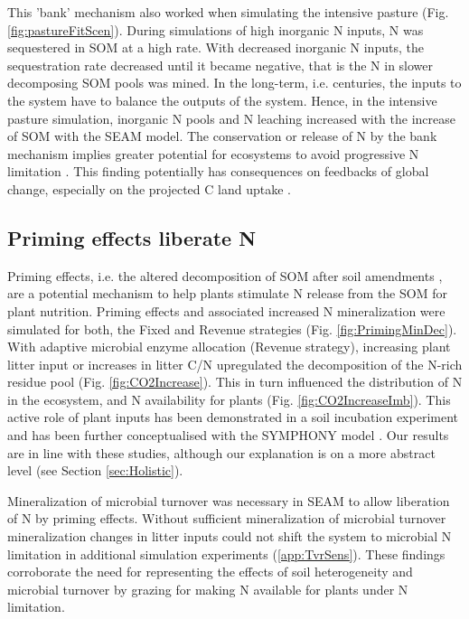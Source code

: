This 'bank' mechanism \citep[sensu][]{Perveen14} also worked when simulating the
intensive pasture (Fig. \ref{fig:pastureFitScen}). During simulations of high
inorganic N inputs, N was sequestered in SOM at a high rate. With decreased
inorganic N inputs, the sequestration rate decreased until it became negative,
that is the N in slower decomposing SOM pools was mined. In the
long-term, i.e.
centuries, the inputs to the system have to balance the outputs of the system. Hence, in
the intensive pasture simulation, inorganic N pools and N leaching increased with
the increase of SOM with the SEAM model. The conservation or release of N by the
bank mechanism implies greater potential for ecosystems to avoid progressive N
limitation \citep{Norby10, Franklin14, Averill15}. This finding
potentially has consequences on feedbacks of global change, especially on the
projected C land uptake \citep{Friedlingstein14}.

\subsection{Priming effects liberate N}
Priming effects, i.e. the altered decomposition of SOM after soil amendments
\citep{Kuzyakov00}, are a potential mechanism to help plants stimulate N release
from the SOM for plant nutrition.
Priming effects and associated increased N mineralization were simulated for
both, the Fixed and Revenue strategies (Fig. \ref{fig:PrimingMinDec}). With
adaptive microbial enzyme allocation (Revenue strategy), increasing
plant litter input or increases in litter C/N upregulated
the decomposition of the N-rich residue pool (Fig.
\ref{fig:CO2Increase}).
This in turn influenced the distribution of N in the ecosystem, and N
availability for plants (Fig.
\ref{fig:CO2IncreaseImb}). This active role of plant inputs has been
demonstrated in a soil incubation experiment \citep{Fontaine11} and has been
further conceptualised with the SYMPHONY model \citep{Perveen14}. Our results
are in line with these studies, although our explanation is on a more abstract
level (see Section \ref{sec:Holistic}). 

Mineralization of microbial turnover was necessary in SEAM to allow liberation
of N by priming effects. Without sufficient mineralization of microbial turnover
mineralization changes in litter inputs could not shift the system to
microbial N limitation in additional simulation experiments (\ref{app:TvrSens}).
These findings corroborate the need for representing the effects of soil
heterogeneity \citep{Manzoni08} and microbial turnover by grazing
\citep{Clarholm85, Raynaud06} for making N available for plants under N
limitation.

